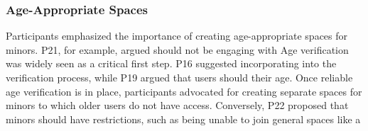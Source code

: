 \subsubsection{Age-Appropriate Spaces}
\label{lab:4-4-5}
Participants emphasized the importance of creating age-appropriate spaces for minors. P21, for example, argued  should not be engaging with  Age verification was widely seen as a critical first step. P16 suggested incorporating  into the verification process, while P19 argued that users should  their age. Once reliable age verification is in place, participants advocated for creating separate spaces for minors to which older users do not have access. Conversely, P22 proposed that minors should have restrictions, such as being unable to join general spaces like a  




